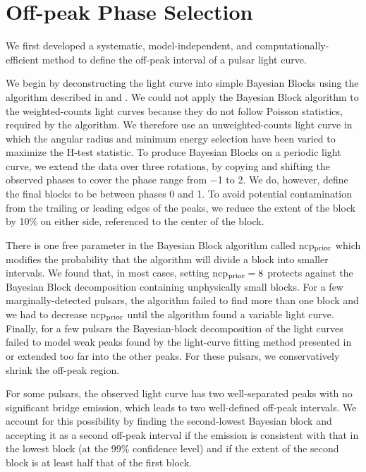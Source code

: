 \section{Off-peak Phase Selection}

We first developed a systematic, model-independent, and computationally-efficient method 
to define the off-peak interval of a pulsar light curve.

We begin by deconstructing the light curve 
into simple Bayesian Blocks using the algorithm described in
\citet{jackson_2005a_algorithm-optimal} and \citet{scargle_2013a_studies-astronomical}.  
We could not apply the Bayesian Block algorithm to the weighted-counts
light curves because they do not follow Poisson statistics, required
by the algorithm.
We therefore use an unweighted-counts light curve in which the angular radius and minimum energy selection have been varied to maximize the H-test statistic.  To produce Bayesian Blocks on a periodic light curve,
we extend the data over three rotations, by copying and shifting the
observed phases to cover the phase range from $-$1 to 2.  We do, however,
define the final blocks to be between phases 0 and 1.  
To avoid potential contamination from the trailing or leading edges of
the peaks, we reduce the extent of the block by 10\% on either side,
referenced to the center of the block.

There is one free parameter in the Bayesian Block algorithm called
ncp$\rm _{prior}$ which modifies the probability that the
algorithm will divide a block into smaller intervals.
We found that, in most cases, setting ncp$\rm _{prior}=8$ protects against
the Bayesian Block decomposition containing unphysically small blocks.
For a few marginally-detected pulsars, the algorithm failed 
to find more than one block and we had to decrease ncp$\rm _{prior}$ until the
algorithm found a variable light curve. Finally, for a few pulsars the 
Bayesian-block decomposition of the light curves failed to model 
weak peaks found by the light-curve fitting method
presented in  or extended
too far into the other peaks. For these pulsars,
we conservatively shrink the off-peak region.

For some pulsars, the observed light curve has two well-separated peaks
with no significant bridge emission, which leads to two well-defined
off-peak intervals.  We account for this possibility by finding the second-lowest 
Bayesian block and accepting it as a second off-peak interval if
the emission is consistent with that in the lowest block (at the 99\%
confidence level) and if the extent of the second block is at least half
that of the first block.

